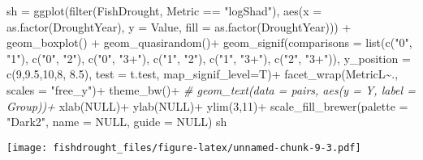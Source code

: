 \documentclass[
]{article}
\newenvironment{Shaded}{\begin{snugshade}}{\end{snugshade}}
\newcommand{\AttributeTok}[1]{\textcolor[rgb]{0.77,0.63,0.00}{#1}}
\newcommand{\CommentTok}[1]{\textcolor[rgb]{0.56,0.35,0.01}{\textit{#1}}}
\newcommand{\ConstantTok}[1]{\textcolor[rgb]{0.00,0.00,0.00}{#1}}
\newcommand{\DecValTok}[1]{\textcolor[rgb]{0.00,0.00,0.81}{#1}}
\newcommand{\FloatTok}[1]{\textcolor[rgb]{0.00,0.00,0.81}{#1}}
\newcommand{\FunctionTok}[1]{\textcolor[rgb]{0.00,0.00,0.00}{#1}}
\newcommand{\NormalTok}[1]{#1}
\newcommand{\OtherTok}[1]{\textcolor[rgb]{0.56,0.35,0.01}{#1}}
\newcommand{\SpecialCharTok}[1]{\textcolor[rgb]{0.00,0.00,0.00}{#1}}
\newcommand{\StringTok}[1]{\textcolor[rgb]{0.31,0.60,0.02}{#1}}
\begin{document}
\begin{Shaded}
\begin{Highlighting}[]
\NormalTok{sh }\OtherTok{=} \FunctionTok{ggplot}\NormalTok{(}\FunctionTok{filter}\NormalTok{(FishDrought, Metric }\SpecialCharTok{==} \StringTok{"logShad"}\NormalTok{),  }\FunctionTok{aes}\NormalTok{(}\AttributeTok{x =} \FunctionTok{as.factor}\NormalTok{(DroughtYear), }\AttributeTok{y =}\NormalTok{ Value, }\AttributeTok{fill =} \FunctionTok{as.factor}\NormalTok{(DroughtYear))) }\SpecialCharTok{+} 
  \FunctionTok{geom\_boxplot}\NormalTok{() }\SpecialCharTok{+}
  \FunctionTok{geom\_quasirandom}\NormalTok{()}\SpecialCharTok{+}
  \FunctionTok{geom\_signif}\NormalTok{(}\AttributeTok{comparisons =} \FunctionTok{list}\NormalTok{(}\FunctionTok{c}\NormalTok{(}\StringTok{"0"}\NormalTok{, }\StringTok{"1"}\NormalTok{), }\FunctionTok{c}\NormalTok{(}\StringTok{"0"}\NormalTok{, }\StringTok{"2"}\NormalTok{), }\FunctionTok{c}\NormalTok{(}\StringTok{"0"}\NormalTok{, }\StringTok{"3+"}\NormalTok{), }
                                 \FunctionTok{c}\NormalTok{(}\StringTok{"1"}\NormalTok{, }\StringTok{"2"}\NormalTok{), }\FunctionTok{c}\NormalTok{(}\StringTok{"1"}\NormalTok{, }\StringTok{"3+"}\NormalTok{), }\FunctionTok{c}\NormalTok{(}\StringTok{"2"}\NormalTok{, }\StringTok{"3+"}\NormalTok{)), }
              \AttributeTok{y\_position =} \FunctionTok{c}\NormalTok{(}\DecValTok{9}\NormalTok{,}\FloatTok{9.5}\NormalTok{,}\DecValTok{10}\NormalTok{,}\DecValTok{8}\NormalTok{, }\FloatTok{8.5}\NormalTok{), }\AttributeTok{test =}\NormalTok{ t.test, }
              \AttributeTok{map\_signif\_level=}\NormalTok{T)}\SpecialCharTok{+}
  \FunctionTok{facet\_wrap}\NormalTok{(MetricL}\SpecialCharTok{\textasciitilde{}}\NormalTok{., }\AttributeTok{scales =} \StringTok{"free\_y"}\NormalTok{)}\SpecialCharTok{+} \FunctionTok{theme\_bw}\NormalTok{()}\SpecialCharTok{+}
 \CommentTok{\# geom\_text(data = pairs, aes(y = Y, label = Group))+}
  \FunctionTok{xlab}\NormalTok{(}\ConstantTok{NULL}\NormalTok{)}\SpecialCharTok{+} \FunctionTok{ylab}\NormalTok{(}\ConstantTok{NULL}\NormalTok{)}\SpecialCharTok{+} \FunctionTok{ylim}\NormalTok{(}\DecValTok{3}\NormalTok{,}\DecValTok{11}\NormalTok{)}\SpecialCharTok{+}
  \FunctionTok{scale\_fill\_brewer}\NormalTok{(}\AttributeTok{palette =} \StringTok{"Dark2"}\NormalTok{, }\AttributeTok{name =} \ConstantTok{NULL}\NormalTok{, }\AttributeTok{guide =} \ConstantTok{NULL}\NormalTok{)}
\NormalTok{sh  }
\end{Highlighting}
\end{Shaded}

\texttt{[image: fishdrought\_files/figure-latex/unnamed-chunk-9-3.pdf]}
\end{document}
